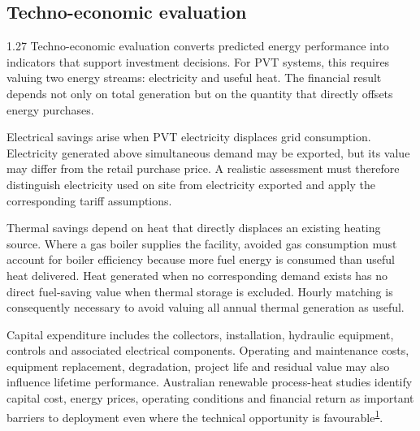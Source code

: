 \documentclass[12pt,letterpaper]{article}
\newcommand{\done}{\ \textcolor{green!45!black}{$\checkmark$}} %
\DeclareRobustCommand{\citenum}[1]{\hyperlink{ref:#1}{#1}} %
\begin{document}
\subsection[Techno-economic evaluation\done]{Techno-economic evaluation}\label{sec14}

\begin{spacing}{1.27}
Techno-economic evaluation converts predicted energy performance into indicators that support investment decisions. For PVT systems, this requires valuing two energy streams: electricity and useful heat. The financial result depends not only on total generation but on the quantity that directly offsets energy purchases.\par

\vspace{0.15in}

Electrical savings arise when PVT electricity displaces grid consumption. Electricity generated above simultaneous demand may be exported, but its value may differ from the retail purchase price. A realistic assessment must therefore distinguish electricity used on site from electricity exported and apply the corresponding tariff assumptions.\par

\vspace{0.15in}

Thermal savings depend on heat that directly displaces an existing heating source. Where a gas boiler supplies the facility, avoided gas consumption must account for boiler efficiency because more fuel energy is consumed than useful heat delivered. Heat generated when no corresponding demand exists has no direct fuel-saving value when thermal storage is excluded. Hourly matching is consequently necessary to avoid valuing all annual thermal generation as useful.\par

\vspace{0.15in}

Capital expenditure includes the collectors, installation, hydraulic equipment, controls and associated electrical components. Operating and maintenance costs, equipment replacement, degradation, project life and residual value may also influence lifetime performance. Australian renewable process-heat studies identify capital cost, energy prices, operating conditions and financial return as important barriers to deployment even where the technical opportunity is favourable\textsuperscript{\citenum{1}}.\par
\end{spacing}
\end{document}
